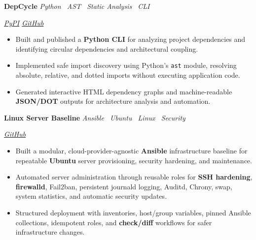 \documentclass[10pt,a4paper]{article}
\newcommand{\projectentry}[3]{%
    \noindent
    \begin{minipage}[t]{0.62\linewidth}
        \raggedright
        \textbf{#1}
        \hspace{0.7em}
        \textit{\color{textgray}#2}
    \end{minipage}%
    \hfill
    \begin{minipage}[t]{0.34\linewidth}
        \raggedleft
        \itshape\color{textgray}#3
    \end{minipage}%
    \par
}
\begin{document}
\vspace{3pt}

\projectentry
    {DepCycle}
    {Python \textperiodcentered\ AST \textperiodcentered\ Static Analysis \textperiodcentered\ CLI}
    {\href{https://pypi.org/project/depcycle/}{PyPI}
    \quad
    \href{https://github.com/Matricess/depcycle}{GitHub}}

\vspace{2pt}

\begin{itemize}
    \item Built and published a \textbf{Python CLI} for analyzing project dependencies and identifying circular dependencies and architectural coupling.

    \item Implemented safe import discovery using Python's \texttt{ast} module, resolving absolute, relative, and dotted imports without executing application code.

    \item Generated interactive HTML dependency graphs and machine-readable \textbf{JSON/DOT} outputs for architecture analysis and automation.
\end{itemize}

\vspace{3pt}

\projectentry
    {Linux Server Baseline}
    {Ansible \textperiodcentered\ Ubuntu \textperiodcentered\ Linux \textperiodcentered\ Security}
    {\href{https://github.com/Kishan-Thanki/linux-server-baseline}{GitHub}}

\vspace{2pt}

\begin{itemize}
    \item Built a modular, cloud-provider-agnostic \textbf{Ansible} infrastructure baseline for repeatable \textbf{Ubuntu} server provisioning, security hardening, and maintenance.

    \item Automated server administration through reusable roles for \textbf{SSH hardening}, \textbf{firewalld}, Fail2ban, persistent journald logging, Auditd, Chrony, swap, system statistics, and automatic security updates.

    \item Structured deployment with inventories, host/group variables, pinned Ansible collections, idempotent roles, and \textbf{check/diff} workflows for safer infrastructure changes.
\end{itemize}
\end{document}
